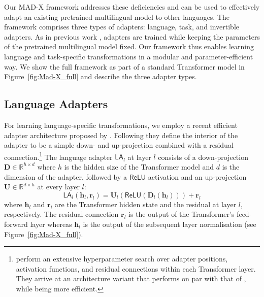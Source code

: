 \documentclass[11pt,a4paper]{article}
\newcommand{\model}[1]{\textsc{MAD-X}}
\begin{document}
Our \model{} framework addresses these deficiencies and can be used to effectively adapt an existing pretrained multilingual model to other languages. The framework comprises three types of adapters: language, task, and invertible adapters. As in previous work \cite{Rebuffi2017adapters,Houlsby2019adapters}, adapters are trained while keeping the parameters of the pretrained multilingual model fixed. Our framework thus enables learning language and task-specific transformations in a modular and parameter-efficient way. We show the full framework as part of a standard Transformer model in Figure~\ref{fig:Mad-X_full} and describe the three adapter types.  
\subsection{Language Adapters}
\label{sec:transformer_adapters}

For learning language-specific transformations, we employ a recent efficient adapter architecture proposed by \citet{Pfeiffer2020adapterfusion}. Following \citet{Houlsby2019adapters} they define the interior of the adapter to be a simple down- and up-projection combined with a residual connection.\footnote{\citet{Pfeiffer2020adapterfusion} perform an extensive hyperparameter search over adapter positions, activation functions, and residual connections within each Transformer layer. They arrive at an architecture variant that performs on par with that of \citet{Houlsby2019adapters}, while being more efficient.}  The language adapter $\mathsf{LA}_l$ at layer $l$ consists of a down-projection $\textbf{D} \in \mathbb{R}^{h \times d}$ where $h$ is the hidden size of the Transformer model and $d$ is the dimension of the adapter, followed by a $\mathsf{ReLU}$ activation and an up-projection $\textbf{U}\in \mathbb{R}^{d \times h}$ at every layer $l$:
\begin{equation}
\mathsf{LA}_l(\textbf{h}_l, \textbf{r}_l) = \textbf{U}_l(\mathsf{ReLU}(\textbf{D}_l(\textbf{h}_l))) + \textbf{r}_l
\end{equation}
where $\textbf{h}_l$ and $\textbf{r}_l$ are the Transformer hidden state and the residual at layer $l$, respectively. The residual connection $\textbf{r}_l$ is the output of the Transformer's feed-forward layer whereas $\textbf{h}_l$ is the output of the subsequent layer normalisation (see Figure~\ref{fig:Mad-X_full}).
\end{document}
